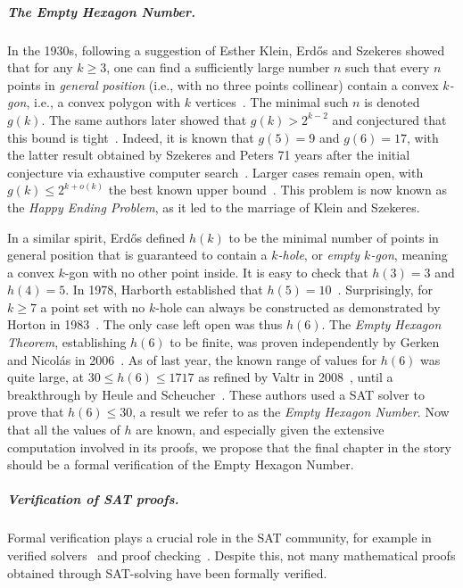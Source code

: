 \subparagraph*{The Empty Hexagon Number.}
In the 1930s,
following a suggestion of Esther Klein,
Erd\H{o}s and Szekeres showed that for any $k \geq 3$,
one can find a sufficiently large number $n$
such that every $n$ points in \emph{general position}
(i.e., with no three points collinear)
contain a convex \emph{$k$-gon}, i.e., a convex polygon with $k$ vertices~\cite{35erdos_combinatorial_problem_geometry}.
The minimal such $n$ is denoted $g(k)$.
The same authors later showed that $g(k) > 2^{k-2}$
and conjectured that this bound is tight~\cite{60erdos_some_extremum_problems_elementary_geometry}.
Indeed, it is known that $g(5) = 9$ and $g(6) = 17$,
with the latter result obtained by Szekeres and Peters 71 years after the initial conjecture
via exhaustive computer search~\cite{06szekeres_computer_solution_17_point_erdos_szekeres_problem}.
Larger cases remain open,
with $g(k) \leq 2^{k+o(k)}$ the best known upper bound~\cite{suk2017erdos,holmsen2017two}.
This problem is now known as the \emph{Happy Ending Problem},
as it led to the marriage of Klein and Szekeres.

In a similar spirit,
Erd\H{o}s defined $h(k)$
to be the minimal number of points in general position
that is guaranteed to contain a \emph{$k$-hole},
or \emph{empty $k$-gon},
meaning a convex $k$-gon with no other point inside.
It is easy to check that $h(3) = 3$ and $h(4) = 5$.
In 1978, Harborth established that $h(5) = 10$~\cite{Harborth1978}.
Surprisingly, for $k \geq 7$ a point set with no $k$-hole
can always be constructed
as demonstrated by Horton in 1983~\cite{hortonSetsNoEmpty1983}.
The only case left open was thus $h(6)$.
The \emph{Empty Hexagon Theorem},
establishing $h(6)$ to be finite,
was proven independently by Gerken and Nicolás in 2006~\cite{gerkenEmptyConvexHexagons2008,nicolasEmptyHexagonTheorem2007}.
As of last year,
the known range of values for $h(6)$ was quite large,
at $30 \leq h(6) \leq 1717$
as refined by Valtr in 2008~\cite{valtr},
until a breakthrough by Heule and Scheucher~\cite{emptyHexagonNumber}.
These authors used a SAT solver
to prove that $h(6) \leq 30$,
a result we refer to as the \emph{Empty Hexagon Number}.
Now that all the values of $h$ are known,
and especially given the extensive computation involved in its proofs,
we propose that the final chapter in the story
should be a formal verification of the Empty Hexagon Number.

\subparagraph*{Verification of SAT proofs.}
Formal verification plays a crucial role in the SAT community,
for example in verified solvers~\cite{10maric_formal_verification_modern_sat_solver_shallow_embedding_isabelle_hol,oeVersatVerifiedModern2012,skotam_creusat_2022}
and proof checking~\cite{lammichEfficientVerifiedSAT2020,tanVerifiedPropagationRedundancy2023}.
Despite this,
not many mathematical proofs obtained through SAT-solving
have been formally verified.


